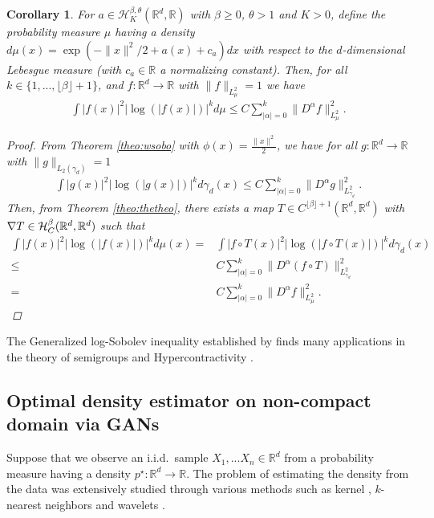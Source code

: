 \documentclass{article}
\newcommand{\black}{\color{black}}
\newtheorem{corollary}{Corollary}
\begin{document}
\begin{corollary}\label{coro:logsogen}
    For $a\in\mathcal{H}^{\beta,\theta}_K(\mathbb{R}^d,\mathbb{R})$ with $\beta\geq 0$, $\theta>1$ and $K>0$, define the probability measure $\mu$ having a density $d\mu(x) = \exp(-\|x\|^2/2+a(x)+c_a)dx$ with respect to the $d$-dimensional Lebesgue measure (with $c_a\in \mathbb{R}$ a normalizing constant). Then, for all $k\in \{1,...,\lfloor \beta \rfloor +1\}$, and $f:\mathbb{R}^d\rightarrow \mathbb{R}$ with $\|f\|_{L_{\mu}^2}=1$ we have
\begin{align*}
    \int |f(x)|^2|\log(|f(x)|)|^{k}d\mu\leq C \sum_{|\alpha|=0}^k\|D^\alpha f\|^2_{L_{\mu}^2}.
\end{align*}
\begin{proof}
    From Theorem \ref{theo:wsobo} with $\phi(x)=\frac{\|x\|^2}{2}$, we have for all $g:\mathbb{R}^d\rightarrow \mathbb{R}$ with $\|g\|_{L_2(\gamma_d)}=1$
    \begin{align*}
    \int |g(x)|^2|\log(|g(x)|)|^{k}d\gamma_d(x)\leq C \sum_{|\alpha|=0}^k\|D^\alpha g\|^2_{L^2_{\gamma_d}}.
\end{align*}
Then, from Theorem \ref{theo:thetheo}, there exists a map $T\in C^{\lfloor \beta \rfloor+1}(\mathbb{R}^d,\mathbb{R}^d)$ with $\nabla T\in  \mathcal{H}^{\beta}_C \black (\mathbb{R}^d,\mathbb{R}^d)$ such that
\begin{align*}
    \int |f(x)|^2|\log(|f(x)|)|^{k}d\mu(x)= &  \int |f\circ T(x)|^2|\log(|f\circ T(x)|)|^{k}d\gamma_d(x)\\
    \leq &C \sum_{|\alpha|=0}^k\|D^\alpha (f\circ T)\|^2_{L^2_{\gamma_d}}
    \\
    = &C \sum_{|\alpha|=0}^k\|D^\alpha f\|^2_{L_{\mu}^2}.
\end{align*}
\end{proof}
\end{corollary}

The Generalized log-Sobolev inequality established by \cite{rosen1976sobolev} finds many applications in the theory of semigroups and  Hypercontractivity \citep{simon1982schrodinger,davies1984ultracontractivity,fabes1993logarithmic}.


\subsection{Optimal density estimator on non-compact domain via GANs}
Suppose that we observe an i.i.d.~sample $X_1,...X_n\in \mathbb{R}^d$ from  a probability measure having a density $p^\star:\mathbb{R}^d\rightarrow \mathbb{R}$. The problem of
estimating the density from the data was extensively studied through various methods such as kernel \citep{mcdonald2017minimax},
$k$-nearest neighbors \citep{dasgupta2014optimal} and wavelets
\citep{donoho1996density}.
\end{document}
